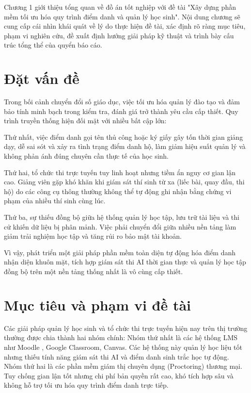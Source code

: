 \documentclass[../DoAn.tex]{subfiles}
\begin{document}
Chương 1 giới thiệu tổng quan về đồ án tốt nghiệp với đề tài "Xây dựng phần mềm tối ưu hóa quy trình điểm danh và quản lý học sinh". Nội dung chương sẽ cung cấp cái nhìn khái quát về lý do thực hiện đề tài, xác định rõ ràng mục tiêu, phạm vi nghiên cứu, đề xuất định hướng giải pháp kỹ thuật và trình bày cấu trúc tổng thể của quyển báo cáo.

\section{Đặt vấn đề}
\label{section:1.1}
Trong bối cảnh chuyển đổi số giáo dục, việc tối ưu hóa quản lý đào tạo và đảm bảo tính minh bạch trong kiểm tra, đánh giá trở thành yêu cầu cấp thiết. Quy trình truyền thống hiện đối mặt với nhiều bất cập lớn:

Thứ nhất, việc điểm danh gọi tên thủ công hoặc ký giấy gây tốn thời gian giảng dạy, dễ sai sót và xảy ra tình trạng điểm danh hộ, làm giảm hiệu suất quản lý và không phản ánh đúng chuyên cần thực tế của học sinh.

Thứ hai, tổ chức thi trực tuyến tuy linh hoạt nhưng tiềm ẩn nguy cơ gian lận cao. Giảng viên gặp khó khăn khi giám sát thí sinh từ xa (liếc bài, quay đầu, thi hộ) do các công cụ thông thường không thể tự động ghi nhận bằng chứng vi phạm của nhiều thí sinh cùng lúc.

Thứ ba, sự thiếu đồng bộ giữa hệ thống quản lý học tập, lưu trữ tài liệu và thi cử khiến dữ liệu bị phân mảnh. Việc phải chuyển đổi giữa nhiều nền tảng làm giảm trải nghiệm học tập và tăng rủi ro bảo mật tài khoản.

Vì vậy, phát triển một giải pháp phần mềm toàn diện tự động hóa điểm danh nhận diện khuôn mặt, tích hợp giám sát thi AI thời gian thực và quản lý học tập đồng bộ trên một nền tảng thống nhất là vô cùng cấp thiết.

\section{Mục tiêu và phạm vi đề tài}
\label{section:1.2}
Các giải pháp quản lý học sinh và tổ chức thi trực tuyến hiện nay trên thị trường thường được chia thành hai nhóm chính:
Nhóm thứ nhất là các hệ thống LMS như Moodle \cite{moodle_attendance_plugin}, Google Classroom, Canvas. Các hệ thống này quản lý học liệu tốt nhưng thiếu tính năng giám sát thi AI và điểm danh sinh trắc học tự động.
Nhóm thứ hai là các phần mềm giám thị chuyên dụng (Proctoring) thương mại. Tuy chống gian lận tốt nhưng chi phí bản quyền rất cao, khó tích hợp sâu và không hỗ trợ tối ưu hóa quy trình điểm danh trực tiếp.
\end{document}
